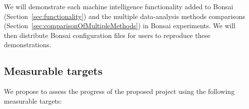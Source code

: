 We will demonstrate each machine intelligence functionality added to Bonsai
(Section~\ref{sec:functionality}) and the multiple
data-analysis methods comparisons
(Section~\ref{sec:comparisonOfMultipleMethods}) in Bonsai experiments. We will
then distribute Bonsai configuration files for users to reproduce these
demonstrations.

\subsection{Measurable targets}
\label{sec:measurableTargets}

We propose to assess the progress of the proposed project using the following
measurable targets:

